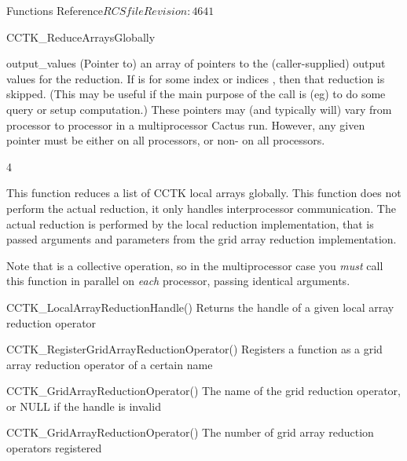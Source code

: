 \begin{cactuspart}{ Functions Reference}{$RCSfile$}{$Revision: 4641 $}
\begin{FunctionDescription}{CCTK\_ReduceArraysGlobally}
\begin{ParameterSection}
\begin{Parameter}{output\_values}
(Pointer to) an array of    pointers to the
(caller-supplied) output values for the reduction.
If   is  for some index or indices   ,
then that reduction is skipped.  (This may be useful if the main
purpose of the call is (eg) to do some query or setup computation.)
These pointers may (and typically will) vary from processor to
processor in a multiprocessor Cactus run.  However, any given pointer
must be either  on all processors, or non- on all processors.
\end{Parameter}
\end{ParameterSection}4

\begin{Discussion}
This function reduces a list of CCTK local arrays globally. This function does not perform the actual reduction, it only handles interprocessor communication. The actual reduction is performed by the local reduction implementation, that is passed arguments and parameters
from the grid array reduction implementation.

Note that  is a collective operation, so in the
multiprocessor case you {\em must\/} call this function in parallel on
{\em each\/} processor, passing identical arguments.
\end{Discussion}

\begin{SeeAlsoSection}
\begin{SeeAlso}{CCTK\_LocalArrayReductionHandle()}
Returns the handle of a given local array reduction operator
\end{SeeAlso}

\begin{SeeAlso}{CCTK\_RegisterGridArrayReductionOperator()}
Registers a function as a grid array reduction operator of a certain name
\end{SeeAlso}

\begin{SeeAlso}{CCTK\_GridArrayReductionOperator()}
The name of the grid reduction operator, or NULL if the handle is invalid
\end{SeeAlso}

\begin{SeeAlso}{CCTK\_GridArrayReductionOperator()}
The number of grid array reduction operators registered
\end{SeeAlso}
\end{SeeAlsoSection}


\end{FunctionDescription}
\end{cactuspart}
